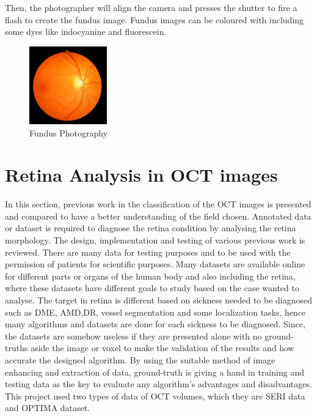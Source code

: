 \begin{itemize}
Then, the photographer will align the camera and presses the shutter to fire a flash to create the fundus image\cite{sinthanayothin1999automated}.
Fundus images can be coloured with including some dyes like indocyanine and fluorescein.
\begin{figure}[htb]
        \centering
        \includegraphics[width=0.3\textwidth]{figures/fundus.jpg} %
  \caption{Fundus Photography \cite{fundus2016}}
  \label{fig:Glaucoma}
\end{figure}
\end{itemize} 

\section{Retina Analysis in OCT images}

In this section, previous work in the classification of the OCT images is presented and compared to have a better understanding of the field chosen.
Annotated data or dataset is required to diagnose the retina condition by analysing the retina morphology.
The design, implementation and testing of various previous work is reviewed.
There are many data for testing purposes and to be used with the permission of patients for scientific purposes.
Many datasets are available online for different parts or organs of the human body and also including the retina, where these datasets have different goals to study based on the case wanted to analyse.
The target in retina is different based on sickness needed to be diagnosed such as DME, AMD,DR, vessel segmentation and some localization tasks, hence many algorithms and datasets are done for each sickness to be diagnosed.
Since, the datasets are somehow useless if they are presented alone with no ground-truths aside the image or voxel to make the validation of the results and how accurate the designed algorithm.
By using the suitable method of image enhancing and extraction of data, ground-truth is giving a hand in training and testing data as the key to evaluate any algorithm's advantages and disadvantages.
This project used two types of data of OCT volumes, which they are SERI data and OPTIMA dataset.

